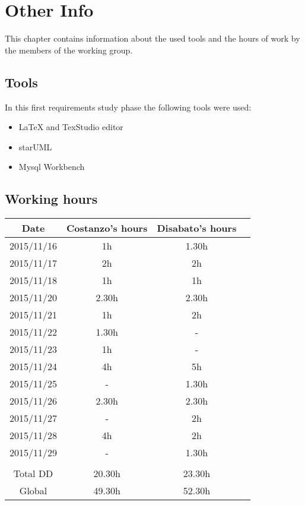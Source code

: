 \documentclass[\mainpath/main]{subfiles}
\begin{document}
\chapter{Other Info}
\label{other_info}

\setmyfancystyle

This chapter contains information about the used tools and the hours of work by the members of the working group.

\section{Tools}
In this first requirements study phase the following tools were used:
\begin{itemize}
	\item \LaTeX{} and TexStudio editor
	\item starUML
	\item Mysql Workbench
\end{itemize}

\clearpage

\section{Working hours}
\begin{table}[h!]
	\centering
\begin{tabular}{cccc}
\hline
Date & 		 Costanzo's hours & Disabato's hours  & \\ \hline
2015/11/16 & 1h 			  & 1.30h 			  & \\ \hline
2015/11/17 & 2h 			  & 2h 				  & \\ \hline 
2015/11/18 & 1h 			  & 1h 				  & \\ \hline
2015/11/20 & 2.30h 			  & 2.30h 			  & \\ \hline
2015/11/21 & 1h 			  & 2h 				  & \\ \hline
2015/11/22 & 1.30h 			  & - 				  & \\ \hline
2015/11/23 & 1h				  & -                 & \\ \hline
2015/11/24 & 4h				  & 5h				  & \\ \hline
2015/11/25 & -				  & 1.30h				  & \\ \hline
2015/11/26 & 2.30h				  & 2.30h				  & \\ \hline
2015/11/27 & -				  & 2h				  & \\ \hline
2015/11/28 & 4h				  & 2h				  & \\ \hline
2015/11/29 & -				  & 1.30h				  & \\ \hline
\\
Total DD   & 20.30h 			  & 23.30h 				  & \\ \hline
Global 	   & 49.30h 		  	  & 52.30h 			  & \\ \hline

\end{tabular}
\end{table}
\end{document}
